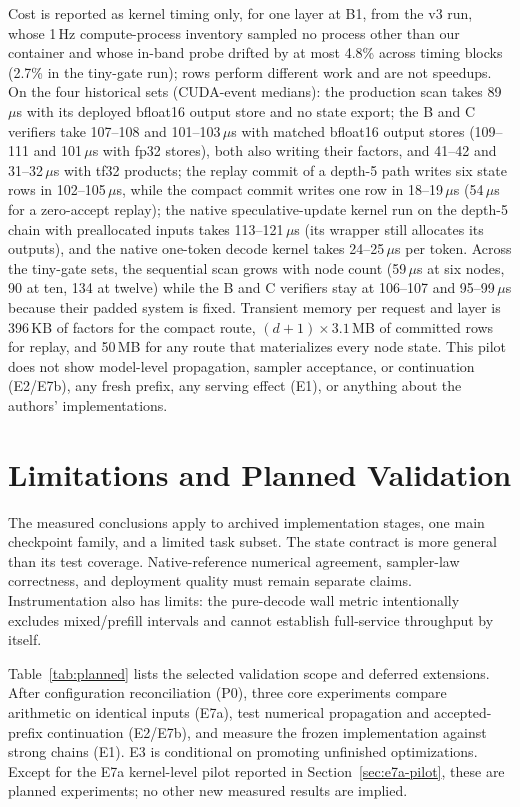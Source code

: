 \documentclass[conference]{IEEEtran}
\begin{document}
Cost is reported as kernel timing only, for one layer at B1, from the v3 run, whose 1\,Hz compute-process inventory sampled no process other than our container and whose in-band probe drifted by at most 4.8\% across timing blocks (2.7\% in the tiny-gate run); rows perform different work and are not speedups. On the four historical sets (CUDA-event medians): the production scan takes 89\,$\mu$s with its deployed bfloat16 output store and no state export; the B and C verifiers take 107--108 and 101--103\,$\mu$s with matched bfloat16 output stores (109--111 and 101\,$\mu$s with fp32 stores), both also writing their factors, and 41--42 and 31--32\,$\mu$s with tf32 products; the replay commit of a depth-5 path writes six state rows in 102--105\,$\mu$s, while the compact commit writes one row in 18--19\,$\mu$s (54\,$\mu$s for a zero-accept replay); the native speculative-update kernel run on the depth-5 chain with preallocated inputs takes 113--121\,$\mu$s (its wrapper still allocates its outputs), and the native one-token decode kernel takes 24--25\,$\mu$s per token. Across the tiny-gate sets, the sequential scan grows with node count (59\,$\mu$s at six nodes, 90 at ten, 134 at twelve) while the B and C verifiers stay at 106--107 and 95--99\,$\mu$s because their padded system is fixed. Transient memory per request and layer is 396\,KB of factors for the compact route, $(d{+}1)\times3.1$\,MB of committed rows for replay, and 50\,MB for any route that materializes every node state. This pilot does not show model-level propagation, sampler acceptance, or continuation (E2/E7b), any fresh prefix, any serving effect (E1), or anything about the authors' implementations.

\section{Limitations and Planned Validation}
\label{sec:planned}
The measured conclusions apply to archived implementation stages, one main checkpoint family, and a limited task subset. The state contract is more general than its test coverage. Native-reference numerical agreement, sampler-law correctness, and deployment quality must remain separate claims. Instrumentation also has limits: the pure-decode wall metric intentionally excludes mixed/prefill intervals and cannot establish full-service throughput by itself.

Table~\ref{tab:planned} lists the selected validation scope and deferred extensions. After configuration reconciliation (P0), three core experiments compare arithmetic on identical inputs (E7a), test numerical propagation and accepted-prefix continuation (E2/E7b), and measure the frozen implementation against strong chains (E1). E3 is conditional on promoting unfinished optimizations. Except for the E7a kernel-level pilot reported in Section~\ref{sec:e7a-pilot}, these are planned experiments; no other new measured results are implied.
\end{document}
